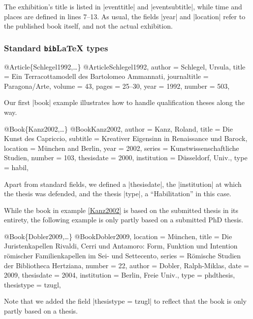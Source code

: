 \documentclass[a4paper,
10pt,
ngerman,
english
]{ltxdoc}
\begin{document}
The exhibition's title is listed in |eventtitle| and |eventsubtitle|, while time and places are defined in lines 7--13. As usual, the fields |year| and |location| refer to the published book itself, and not the actual exhibition.

\subsubsection{Standard \texttt{bib}\LaTeX{} types}

\begin{bibexample}[label=Schlegel1992]{{@}Article\{Schlegel1992,…\}}
@Article{Schlegel1992,
  author       = {Schlegel, Ursula},
  title        = {Ein Terracottamodell des Bartolomeo Ammannati},
  journaltitle = {Paragona/Arte},
  volume       = {43},
  pages        = {25--30},
  year         = {1992},
  number       = {503},
}
\end{bibexample}

Our first |book| example illustrates how to handle qualification theses along the way.
\begin{bibexample}[label=Kanz2002]{{@}Book\{Kanz2002,…\}}
@Book{Kanz2002,
  author      = {Kanz, Roland},
  title       = {Die Kunst des Capriccio},
  subtitle    = {Kreativer Eigensinn in Renaissance und Barock},
  location    = {München and Berlin},
  year        = {2002},
  series      = {Kunstwissenschaftliche Studien},
  number      = {103},
  thesisdate  = {2000},
  institution = {Düsseldorf, Univ.},
  type        = {habil},
}
\end{bibexample}
Apart from standard fields, we defined a |thesisdate|, the |institution| at which the thesis was defended, and the thesis |type|, a \foreignquote{ngerman}{Habilitation} in this case.

While the book in example \ref{Kanz2002} is based on the submitted thesis in its entirety, the following example is only partly based on a submitted PhD thesis.
\begin{bibexample}[label=Dobler2009]{{@}Book\{Dobler2009,…\}}
@Book{Dobler2009,
  location = {München},
  title = {Die Juristenkapellen Rivaldi, Cerri und Antamoro: Form, Funktion und Intention römischer Familienkapellen im Sei- und Settecento},
  series = {Römische Studien der Bibliotheca Hertziana},
  number = {22},
  author = {Dobler, Ralph-Miklas},
  date = {2009},
  thesisdate = {2004},
  institution = {Berlin, Freie Univ.},
  type = {phdthesis},
  thesistype = {tzugl},
}
\end{bibexample}
Note that we added the field |thesistype = {tzugl}| to reflect that the book is only partly based on a thesis.
\end{document}
